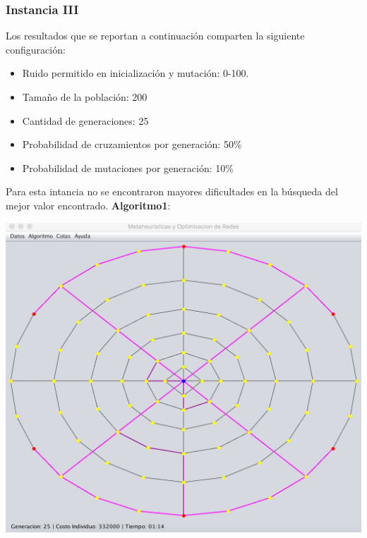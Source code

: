 \documentclass{extarticle}
\begin{document}
\subsubsection{Instancia III}
Los resultados que se reportan a continuación comparten la siguiente configuración:
\begin{itemize}
	\item Ruido permitido en inicialización y mutación: 0-100.
	\item Tamaño de la población: 200
	\item Cantidad de generaciones: 25
	\item Probabilidad de cruzamientos por generación: 50\%
	\item Probabilidad de mutaciones por generación: 10\%
\end{itemize}

Para esta intancia no se encontraron mayores dificultades en la búsqueda del mejor valor encontrado.
\newpage
\textbf{Algoritmo1}:
\begin{center}
	\includegraphics[scale=0.4]{img/metaheuristica/i3_s1}
\end{center}
\end{document}

